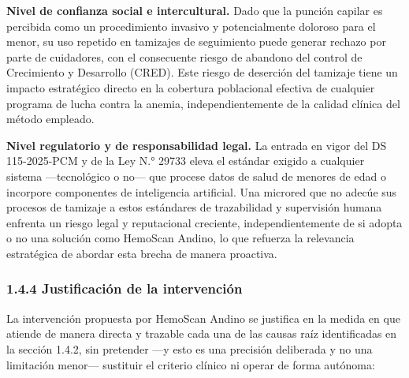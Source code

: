 \documentclass[11pt,a4paper]{article}
\begin{document}
\textbf{Nivel de confianza social e intercultural.} Dado que la punción capilar es percibida como un procedimiento invasivo y potencialmente doloroso para el menor, su uso repetido en tamizajes de seguimiento puede generar rechazo por parte de cuidadores, con el consecuente riesgo de abandono del control de Crecimiento y Desarrollo (CRED). Este riesgo de deserción del tamizaje tiene un impacto estratégico directo en la cobertura poblacional efectiva de cualquier programa de lucha contra la anemia, independientemente de la calidad clínica del método empleado.

\textbf{Nivel regulatorio y de responsabilidad legal.} La entrada en vigor del DS 115-2025-PCM y de la Ley N.° 29733 eleva el estándar exigido a cualquier sistema ---tecnológico o no--- que procese datos de salud de menores de edad o incorpore componentes de inteligencia artificial. Una microred que no adecúe sus procesos de tamizaje a estos estándares de trazabilidad y supervisión humana enfrenta un riesgo legal y reputacional creciente, independientemente de si adopta o no una solución como HemoScan Andino, lo que refuerza la relevancia estratégica de abordar esta brecha de manera proactiva.

\subsubsection{1.4.4 Justificación de la intervención}\label{justificaciuxf3n-de-la-intervenciuxf3n}

La intervención propuesta por HemoScan Andino se justifica en la medida en que atiende de manera directa y trazable cada una de las causas raíz identificadas en la sección 1.4.2, sin pretender ---y esto es una precisión deliberada y no una limitación menor--- sustituir el criterio clínico ni operar de forma autónoma:
\end{document}
